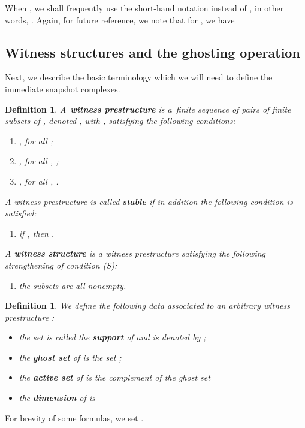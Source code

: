 \documentclass{amsart}[10pt]
\newtheorem{df}[theorem]{Definition}
\numberwithin{equation}{section}
\numberwithin{figure}{section}
\numberwithin{table}{section}
\begin{document}
When , we shall frequently use the short-hand notation 
instead of , in other words, . 
Again, for future reference, we note that for , we have



\subsection{Witness structures and the ghosting operation} 

\nin Next, we describe the basic terminology which we will need to
define the immediate snapshot complexes.

\begin{df}\label{df:ws}
A~{\bf witness prestructure} is a~finite sequence of pairs of finite
subsets of , denoted , with
, satisfying the following conditions:
\begin{enumerate}
\item[(P1)] , for all ;
\item[(P2)] , for all , ;
\item[(P3)] , for all , .
\end{enumerate}

\noindent
A witness prestructure is called {\bf stable} if in addition the
following condition is satisfied:
\begin{enumerate}
\item[(S)] if , then .
\end{enumerate}

\noindent
A {\bf witness structure} is a witness prestructure satisfying the
following strengthening of condition (S):
\begin{enumerate}
\item[(W)] the subsets  are all nonempty.
\end{enumerate}
\end{df}

\begin{df}
We define the following data associated to an arbitrary witness
prestructure :
\begin{itemize}
\item the set  is called the {\bf support} of  and is
denoted by ;
\item the {\bf ghost set} of  is the set
  ;
\item the {\bf active set} of  is the complement of the ghost set

\item the {\bf dimension} of  is
  
\end{itemize}
\end{df}
\noindent
For brevity of some formulas, we set .
\end{document}

